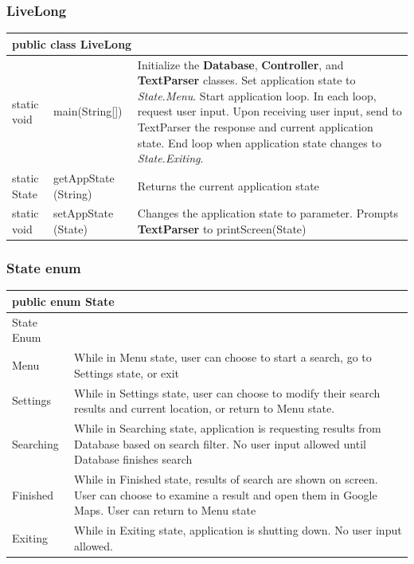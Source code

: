 \documentclass[12pt]{article}
\begin{document}
\subsubsection{LiveLong}
\begin{center}
\begin{tabular}{p{0.1\hsize}|p{0.25\hsize}|p{0.50\hsize}}
\multicolumn{3}{l}{\textbf{public class LiveLong}} \\
\hline
static void & main(String[]) & Initialize the \textbf{Database}, \textbf{Controller}, and \textbf{TextParser} classes. Set application state to \textit{State.Menu}. Start application loop. In each loop, request user input. Upon receiving user input, send to TextParser the response and current application state. End loop when application state changes to \textit{State.Exiting}. \\
\hline
static State 	& getAppState (String) & Returns the current application state \\
\hline
static void 	& setAppState (State) & Changes the application state to parameter. Prompts \textbf{TextParser} to printScreen(State) \\
\hline
\end{tabular}
\end{center}


\subsubsection{State enum}
\begin{center}
\begin{tabular}{p{0.20\hsize}p{0.7\hsize}}
\multicolumn{2}{l}{\textbf{public enum State}} \\
\hline
State Enum & ~ \\
\hline
Menu & While in Menu state, user can choose to start a search, go to Settings state, or exit \\
Settings & While in Settings state, user can choose to modify their search results and current location, or return to Menu state. \\
Searching & While in Searching state, application is requesting results from Database based on search filter. No user input allowed until Database finishes search \\
Finished & While in Finished state, results of search are shown on screen. User can choose to examine a result and open them in Google Maps. User can return to Menu state \\
Exiting & While in Exiting state, application is shutting down. No user input allowed. \\
\hline
\end{tabular}
\end{center}
\end{document}
